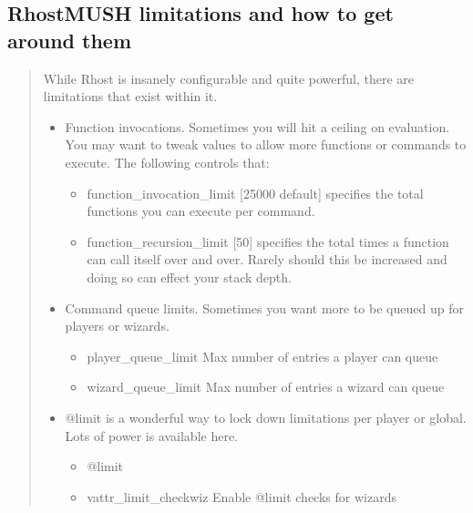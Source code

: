 \documentclass[letterpaper,10pt,english]{sphinxmanual}
\begin{document}
\subsection{RhostMUSH limitations and how to get around them}
\label{\detokenize{features:rhostmush-limitations-and-how-to-get-around-them}}\begin{quote}

\sphinxAtStartPar
While Rhost is insanely configurable and quite powerful, there are
limitations that exist within it.
\begin{itemize}
\item {} 
\sphinxAtStartPar
Function invocations.  Sometimes you will hit a ceiling on evaluation.
You may want to tweak values to allow more functions or commands
to execute.  The following controls that:
\begin{itemize}
\item {} 
\sphinxAtStartPar
function\_invocation\_limit {[}25000 default{]} \sphinxhyphen{} specifies the total functions you can execute per command.

\item {} 
\sphinxAtStartPar
function\_recursion\_limit {[}50{]} \sphinxhyphen{} specifies the total times a function can call itself over and over.  Rarely should this be increased and doing so can effect your stack depth.

\end{itemize}

\item {} 
\sphinxAtStartPar
Command queue limits.  Sometimes you want more to be queued up for
players or wizards.
\begin{itemize}
\item {} 
\sphinxAtStartPar
player\_queue\_limit  \sphinxhyphen{} Max number of entries a player can queue

\item {} 
\sphinxAtStartPar
wizard\_queue\_limit  \sphinxhyphen{} Max number of entries a wizard can queue

\end{itemize}

\item {} 
\sphinxAtStartPar
@limit is a wonderful way to lock down limitations per player or global.  Lots of power is available here.
\begin{itemize}
\item {} 
\sphinxAtStartPar
@limit

\item {} 
\sphinxAtStartPar
vattr\_limit\_checkwiz \sphinxhyphen{} Enable @limit checks for wizards


\end{itemize}
\end{itemize}
\end{quote}
\end{document}

